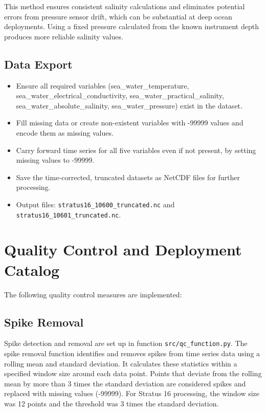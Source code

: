 \documentclass[11pt]{article}
\newcommand{\projectname}{stratus}  %
\newcommand{\displayprojectname}{Stratus}
\newcommand{\casenumber}{16}  %
\newcommand{\FirstInstrument}{10600}
\newcommand{\SecondInstrument}{10601}
\newcommand{\WindowSize}{12}  %
\newcommand{\ThresholdValue}{3}  %
\begin{document}
This method ensures consistent salinity calculations and eliminates potential errors from pressure sensor drift, 
which can be substantial at deep ocean deployments. 
Using a fixed pressure calculated from the known instrument depth produces more reliable salinity values.

\subsection{Data Export}

\begin{itemize}
\item Ensure all required variables (sea\_water\_temperature, sea\_water\_electrical\_conductivity, sea\_water\_practical\_salinity, sea\_water\_absolute\_salinity, sea\_water\_pressure) exist in the dataset.
\item Fill missing data or create non-existent variables with -99999 values and encode them as missing values.
\item Carry forward time series for all five variables even if not present, by setting missing values to -99999.
\item Save the time-corrected, truncated datasets as NetCDF files for further processing.
\item Output files: 
\texttt{\projectname\casenumber\_\FirstInstrument\_truncated.nc}
and \texttt{\projectname\casenumber\_\SecondInstrument\_truncated.nc}.
\end{itemize}


\section{Quality Control and Deployment Catalog}
The following quality control measures are implemented:

\subsection{Spike Removal}
Spike detection and removal are set up in function \texttt{src/qc\_function.py}. 
The spike removal function identifies and removes spikes from time series data using a rolling mean and standard deviation. 
It calculates these statistics within a specified window size around each data point. 
Points that deviate from the rolling mean by more than \ThresholdValue{} times the standard deviation are considered spikes and replaced with missing values (-99999). 
For \displayprojectname{} \casenumber{} processing, the window size was \WindowSize{} points and the threshold was \ThresholdValue{} times the standard deviation.
\end{document}
